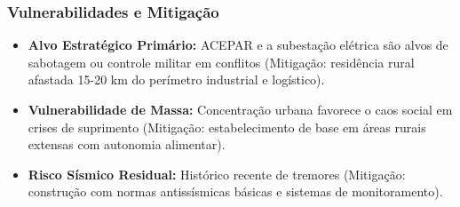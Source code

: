 \subsubsection{Vulnerabilidades e
Mitigação}

\begin{itemize}
\tightlist
\item
  \textbf{Alvo Estratégico Primário:} ACEPAR e a subestação elétrica são
  alvos de sabotagem ou controle militar em conflitos (Mitigação:
  residência rural afastada 15-20 km do perímetro industrial e
  logístico).
\item
  \textbf{Vulnerabilidade de Massa:} Concentração urbana favorece o caos
  social em crises de suprimento (Mitigação: estabelecimento de base em
  áreas rurais extensas com autonomia alimentar).
\item
  \textbf{Risco Sísmico Residual:} Histórico recente de tremores
  (Mitigação: construção com normas antissísmicas básicas e sistemas de
  monitoramento).
\end{itemize}

